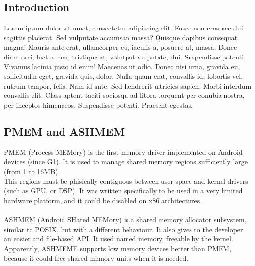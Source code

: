 \documentclass[a4paper,10pt]{article}
\begin{document}
\vspace{4ex}	%
\begin{multicols}{2}

\section{Introduction}

Lorem ipsum dolor sit amet, consectetur adipiscing elit.  Fusce non eros nec dui
sagittis placerat. Sed vulputate accumsan massa? Quisque dapibus consequat
magna! Mauris ante erat, ullamcorper eu, iaculis a, posuere at, massa. Donec
diam orci, luctus non, tristique at, volutpat vulputate, dui.  Suspendisse
potenti. Vivamus lacinia justo id enim! Maecenas ut odio. Donec nisi urna,
gravida eu, sollicitudin eget, gravida quis, dolor. Nulla quam erat, convallis
id, lobortis vel, rutrum tempor, felis. Nam id ante. Sed hendrerit ultricies
sapien. Morbi interdum convallis elit. Class aptent taciti sociosqu ad litora
torquent per conubia nostra, per inceptos himenaeos. Suspendisse potenti.
Praesent egestas.


\subsection{PMEM and ASHMEM}

PMEM (Process MEMory) is the first memory driver implemented on Android devices (since G1).
It is used to manage shared memory regions sufficiently large (from 1 to 16MB).\\
This regions must be phisically contiguous between user space and kernel drivers (such as GPU, or DSP).
It was written specifically to be used in a very limited hardware platform, and it could be disabled on x86 architectures.
\\
\\
ASHMEM (Android SHared MEMory) is a shared memory allocator subsystem, similar to POSIX, but with a
different behaviour. It also gives to the developer an easier and file-based API.
It used named memory, freeable by the kernel.
Apparently, ASHMEME supports low memory devices better than PMEM, because it could
free shared memory units when it is needed.

\begin{table}
\end{table}



\end{multicols}
\end{document}
